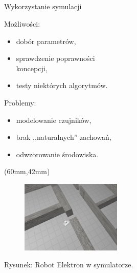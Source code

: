 \documentclass[xcolor=x11names,compress]{beamer}
\renewcommand{\(}{\begin{columns}}
\renewcommand{\)}{\end{columns}}
\newcommand{\<}[1]{\begin{column}{#1}}
\renewcommand{\>}{\end{column}}
\begin{document}
\subsection*{}
\begin{frame}{Wykorzystanie symulacji}


\alert{Możliwości:}
\begin{itemize}
\item dobór parametrów,
\item sprawdzenie poprawności \\koncepcji,
\item testy niektórych algorytmów.
\end{itemize}

\vspace{.7cm}

\alert{Problemy:}
\begin{itemize}
\item modelowanie czujników,
\item brak ,,naturalnych'' zachowań,
\item odwzorowanie środowiska.
\end{itemize}

\begin{textblock*}{70mm}(60mm,42mm)%
    \begin{minipage}[c]{70mm}%
	\begin{figure}[h!]
	\includegraphics[width=4.8cm]{../MSc/img/gazebo}
	\end{figure}
	\hspace{1cm}\scriptsize \alert{Rysunek:} Robot Elektron w symulatorze.
    \end{minipage}
\end{textblock*}

\end{frame}
\end{document}
